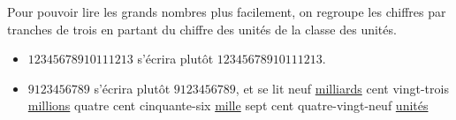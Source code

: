 \begin{prop*}{}{}
Pour pouvoir lire les grands nombres plus facilement, on regroupe les chiffres par tranches de trois en partant du chiffre des unités de la classe des unités.
\end{prop*}

\begin{exemple*}{}{}
\begin{itemize}[label=$-$]
	\item $12345678910111213$ s'écrira plutôt $\num{12345678910111213}$.
	\item $9123456789$ s'écrira plutôt $\num{9123456789}$, et se lit \og neuf \underline{milliards} cent vingt-trois \underline{millions} quatre cent cinquante-six \underline{mille} sept cent quatre-vingt-neuf \underline{unités} \fg
\end{itemize}
\end{exemple*}